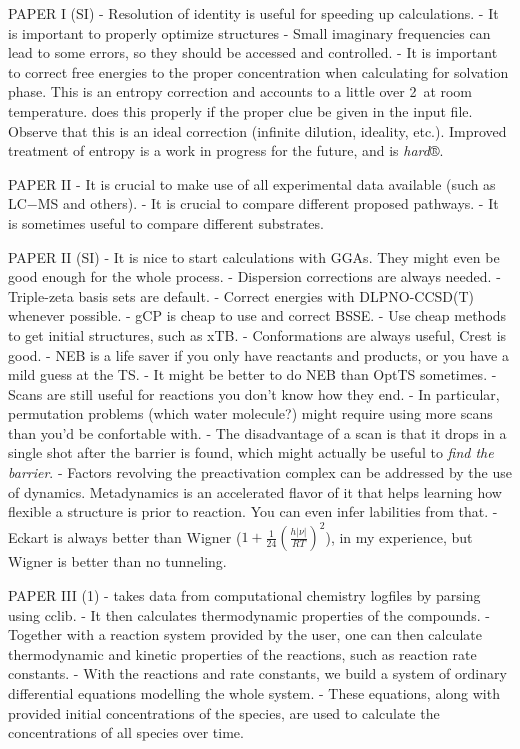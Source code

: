 PAPER I (SI)
- Resolution of identity is useful for speeding up calculations.
- It is important to properly optimize structures
- Small imaginary frequencies can lead to some errors,
so they should be accessed and controlled.
- It is important to correct free energies to the proper
concentration when calculating for solvation phase.
This is an entropy correction and accounts to
a little over 2~\kcalmol at room temperature.
\overreact{} does this properly if the proper clue be
given in the input file.
Observe that this is an ideal correction (infinite dilution, ideality, etc.).
Improved treatment of entropy is a work in progress for the future,
and is \emph{hard}®.

PAPER II
- It is crucial to make use of all experimental data available (such as LC−MS and others).
- It is crucial to compare different proposed pathways.
- It is sometimes useful to compare different substrates.

PAPER II (SI)
- It is nice to start calculations with GGAs.
They might even be good enough for the whole process.
- Dispersion corrections are always needed.
- Triple-zeta basis sets are default.
- Correct energies with DLPNO-CCSD(T) whenever possible.
- gCP is cheap to use and correct BSSE.
- Use cheap methods to get initial structures, such as xTB.
- Conformations are always useful, Crest is good.
- NEB is a life saver if you only have reactants and products,
or you have a mild guess at the TS.
- It might be better to do NEB than OptTS sometimes.
- Scans are still useful for reactions you don't know how they end.
- In particular, permutation problems (which water molecule?) might require
using more scans than you'd be confortable with.
- The disadvantage of a scan is that it drops in a single shot
after the barrier is found, which might actually be useful
to \emph{find the barrier}.
- Factors revolving the preactivation complex can be
addressed by the use of dynamics.
Metadynamics is an accelerated flavor of it that
helps learning how flexible a structure is prior to reaction.
You can even infer labilities from that.
- Eckart is always better than
Wigner ($1 + \frac{1}{24} \left( \frac{h |\nu|}{R T} \right)^2$),
in my experience, but Wigner is better than no tunneling.

PAPER III (1)
- \overreact{} takes data from computational chemistry logfiles by parsing using cclib.
- It then calculates thermodynamic properties of the compounds.
- Together with a reaction system provided by the user,
one can then calculate thermodynamic and kinetic properties of the reactions,
such as reaction rate constants.
- With the reactions and rate constants, we build a system of ordinary differential equations
modelling the whole system.
- These equations, along with provided initial concentrations of the species,
are used to calculate the concentrations of all species over time.

